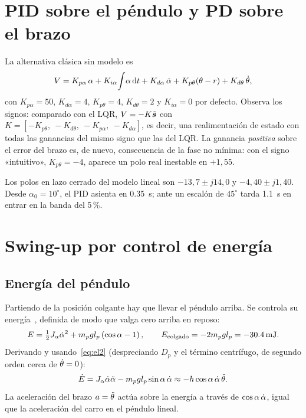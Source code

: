 \section{PID sobre el péndulo y PD sobre el brazo}

La alternativa clásica sin modelo es
\begin{equation}
  V = K_{p\alpha}\,\alpha + K_{i\alpha}\!\int\!\alpha\,\mathrm{d} t + K_{d\alpha}\,\dot{\alpha} + K_{p\theta}(\theta-r) + K_{d\theta}\,\dot{\theta} ,
\end{equation}
con $K_{p\alpha}=50$, $K_{d\alpha}=4$, $K_{p\theta}=4$, $K_{d\theta}=2$ y $K_{i\alpha}=0$ por defecto. Observa los signos: comparado con el LQR, $V=-K\tilde{\bm{s}}$ con $K=[-K_{p\theta},\ -K_{d\theta},\ -K_{p\alpha},\ -K_{d\alpha}]$, es decir, una realimentación de estado con todas las ganancias del mismo signo que las del LQR. La ganancia \emph{positiva} sobre el error del brazo es, de nuevo, consecuencia de la fase no mínima: con el signo «intuitivo», $K_{p\theta}=-4$, aparece un polo real inestable en $+1{,}55$.

Los polos en lazo cerrado del modelo lineal son $-13{,}7\pm j14{,}0$ y $-4{,}40\pm j1{,}40$. Desde $\alpha_0=10^\circ$, el PID asienta en \SI{0.35}{s}; ante un escalón de $45^\circ$ tarda \SI{1.1}{s} en entrar en la banda del 5\,\%.

\section{Swing-up por control de energía}
\label{sec:swingup}

\subsection{Energía del péndulo}
Partiendo de la posición colgante hay que llevar el péndulo arriba. Se controla su energía~\cite{astrom2000}, definida de modo que valga cero arriba en reposo:
\begin{equation}
  E = \tfrac12J_\alpha\dot{\alpha}^2 + m_pgl_p\left(\cos\alpha-1\right),\qquad E_{\text{colgado}} = -2m_pgl_p = \SI{-30.4}{mJ}.
  \label{eq:energia}
\end{equation}
Derivando y usando~\eqref{eq:el2} (despreciando $D_p$ y el término centrífugo, de segundo orden cerca de $\dot{\theta}=0$):
\begin{equation}
  \dot E = J_\alpha\dot{\alpha}\ddot{\alpha} - m_pgl_p\sin\alpha\,\dot{\alpha} \approx -h\cos\alpha\,\dot{\alpha}\,\ddot{\theta} .
  \label{eq:Edot}
\end{equation}
La aceleración del brazo $a=\ddot{\theta}$ actúa sobre la energía a través de $\cos\alpha\,\dot{\alpha}$, igual que la aceleración del carro en el péndulo lineal.

